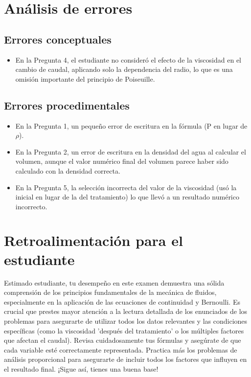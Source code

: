 \documentclass[11pt,a4paper]{article}
\begin{document}
\section*{Análisis de errores}

\subsection*{Errores conceptuales}
\begin{itemize}[leftmargin=1.5em, itemsep=2pt]
  \item En la Pregunta 4, el estudiante no consideró el efecto de la viscosidad en el cambio de caudal, aplicando solo la dependencia del radio, lo que es una omisión importante del principio de Poiseuille.
\end{itemize}

\subsection*{Errores procedimentales}
\begin{itemize}[leftmargin=1.5em, itemsep=2pt]
  \item En la Pregunta 1, un pequeño error de escritura en la fórmula (P en lugar de $\rho$).
  \item En la Pregunta 2, un error de escritura en la densidad del agua al calcular el volumen, aunque el valor numérico final del volumen parece haber sido calculado con la densidad correcta.
  \item En la Pregunta 5, la selección incorrecta del valor de la viscosidad (usó la inicial en lugar de la del tratamiento) lo que llevó a un resultado numérico incorrecto.
\end{itemize}

\section*{Retroalimentación para el estudiante}
\begin{tcolorbox}[cajaRecomendacion, title={Dirigido a: barbara marcano 31729255}]
Estimado estudiante, tu desempeño en este examen demuestra una sólida comprensión de los principios fundamentales de la mecánica de fluidos, especialmente en la aplicación de las ecuaciones de continuidad y Bernoulli. Es crucial que prestes mayor atención a la lectura detallada de los enunciados de los problemas para asegurarte de utilizar todos los datos relevantes y las condiciones específicas (como la viscosidad 'después del tratamiento' o los múltiples factores que afectan el caudal). Revisa cuidadosamente tus fórmulas y asegúrate de que cada variable esté correctamente representada. Practica más los problemas de análisis proporcional para asegurarte de incluir todos los factores que influyen en el resultado final. ¡Sigue así, tienes una buena base!
\end{tcolorbox}
\end{document}
